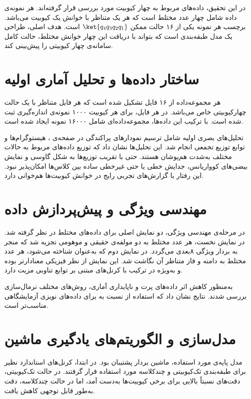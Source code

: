 در این تحقیق، داده‌های مربوط به چهار کیوبیت مورد بررسی قرار گرفته‌اند. هر نمونه‌ی داده شامل چهار عدد مختلط است که هر یک متناظر با خوانش یک کیوبیت می‌باشد. برچسب هر نمونه یکی از ۱۶ حالت ممکن 
$\ket{q_4 q_3 q_2 q_1}$
 است. هدف اصلی، طراحی یک مدل طبقه‌بندی است که بتواند با دریافت این چهار خوانش مختلط، حالت کامل سامانه‌ی چهار کیوبیتی را پیش‌بینی کند.

\section{ساختار داده‌ها و تحلیل آماری اولیه}
هر مجموعه‌داده از ۱۶ فایل تشکیل شده است که هر فایل متناظر با یک حالت چهارکیوبیتی خاص می‌باشد. در هر فایل، برای هر کیوبیت ۱۰۰۰ نمونه‌ی اندازه‌گیری ثبت شده است. با ترکیب این داده‌ها، مجموعه‌داده‌ای شامل ۱۶۰۰۰ نمونه ایجاد شده است.

تحلیل‌های بصری اولیه شامل ترسیم نمودارهای پراکندگی در صفحه‌ی ، هیستوگرام‌ها و توابع توزیع تجمعی انجام شد. این تحلیل‌ها نشان داد که توزیع داده‌های مربوط به حالات مختلف به‌شدت هم‌پوشان هستند. حتی با تقریب توزیع‌ها به شکل گاوسی و نمایش بیضی‌های کوواریانس، جدایش خطی یا حتی غیرخطی ساده بین کلاس‌ها امکان‌پذیر نبود. این رفتار با گزارش‌های تجربی رایج در خوانش کیوبیت‌ها هم‌خوانی دارد.

\section{مهندسی ویژگی و پیش‌پردازش داده}
در مرحله‌ی مهندسی ویژگی، دو نمایش اصلی برای داده‌های مختلط در نظر گرفته شد. در نمایش نخست، هر عدد مختلط به دو مولفه‌ی حقیقی و موهومی تجزیه شد که منجر به بردار ویژگی ۸بعدی می‌گردد. در نمایش دوم که به‌عنوان  شناخته می‌شود، هر عدد مختلط به دامنه و فاز متناظر آن نگاشت شد. این نمایش از نظر فیزیکی معنادارتر بوده و به‌ویژه در ترکیب با کرنل‌های مبتنی بر توابع تناوبی مزیت دارد.

به‌منظور کاهش اثر داده‌های پرت و ناپایداری آماری، روش‌های مختلف نرمال‌سازی بررسی شدند. نتایج نشان داد که استفاده از  نسبت به  برای داده‌های نویزی آزمایشگاهی مناسب‌تر است.

\section{مدل‌سازی و الگوریتم‌های یادگیری ماشین}
مدل پایه‌ی مورد استفاده، ماشین بردار پشتیبان  بود. در ابتدا، کرنل‌های استاندارد نظیر  برای طبقه‌بندی تک‌کیوبیتی و چندکلاسه مورد استفاده قرار گرفتند. در حالت تک‌کیوبیتی، دقت‌های نسبتاً بالایی برای برخی کیوبیت‌ها به‌دست آمد، اما در حالت چندکلاسه، دقت به‌طور قابل توجهی کاهش یافت.

